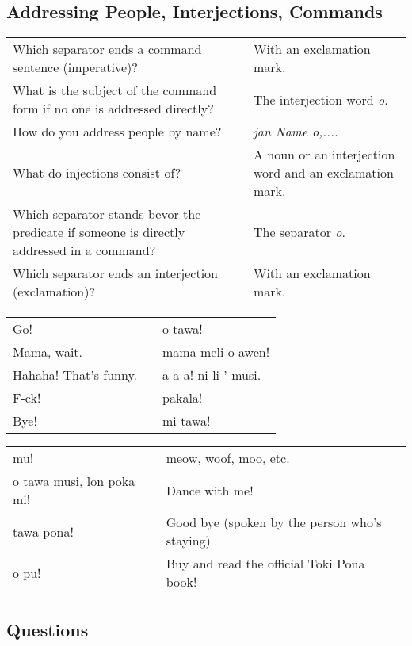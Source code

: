 \subsection*{Addressing People, Interjections, Commands} 
\label{'commands_interjections'}
%
\begin{supertabular}{p{5,5cm}|ll}
Which separator ends a command sentence (imperative)? && With an exclamation mark. \\ %
What is the subject of the command form if no one is addressed directly? && The interjection word \textit{o}. \\ %
How do you address people by name? && \textit{jan Name o,.... } \\ %
What do injections consist of? && A noun or an interjection word and an exclamation mark. \\ %
Which separator stands bevor  the predicate if someone is directly addressed in a command? && The separator \textit{o}. \\ %
Which separator ends an interjection (exclamation)? && With an exclamation mark. \\ %
\end{supertabular}

\begin{supertabular}{p{5,5cm}|ll}
Go!  && o tawa! \\ %
Mama, wait.  && mama meli o awen! \\ %
Hahaha! That's funny.  && a a a! ni li ' musi. \\ %
F-ck! && pakala! \\ %
Bye!  && mi tawa!  \\ %
\end{supertabular}  

\begin{supertabular}{p{5,5cm}|ll}
mu!  && meow, woof, moo, etc. \\
o tawa musi, lon poka mi!  && Dance with me! \\
tawa pona!  && Good bye (spoken by the person who's staying) \\
o pu! && Buy and read the official Toki Pona book! \\
\end{supertabular} 

\newpage
%
\subsection*{Questions} 
\label{'questions_using_seme'}
%

